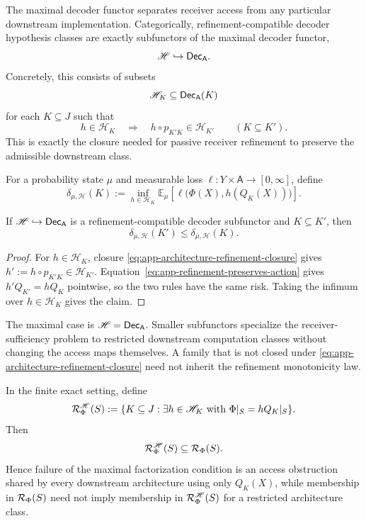 The maximal decoder functor separates receiver access from any particular downstream implementation. Categorically, refinement-compatible decoder hypothesis classes are exactly subfunctors of the maximal decoder functor,
\[
\mathscr H\hookrightarrow\mathsf{Dec}_{\mathsf A}.
\]
Concretely, this consists of subsets
\[
\mathscr H_K\subseteq\mathsf{Dec}_{\mathsf A}(K)
\]
for each $K\subseteq J$ such that
\begin{equation}
h\in\mathscr H_K
\quad\Longrightarrow\quad
h\circ p_{K'K}\in\mathscr H_{K'}
\qquad(K\subseteq K').
\label{eq:app-architecture-refinement-closure}
\end{equation}
This is exactly the closure needed for passive receiver refinement to preserve the admissible downstream class.

For a probability state $\mu$ and measurable loss $\ell:Y\times\mathsf A\to[0,\infty]$, define
\[
\delta_{\mu,\mathscr H}(K)
:=
\inf_{h\in\mathscr H_K}
\mathbb E_\mu\!\left[\ell\bigl(\Phi(X),h(Q_K(X))\bigr)\right].
\]

\begin{proposition}
\label{prop:app-architecture-refinement-monotonicity}
If $\mathscr H\hookrightarrow\mathsf{Dec}_{\mathsf A}$ is a refinement-compatible decoder subfunctor and $K\subseteq K'$, then
\[
\delta_{\mu,\mathscr H}(K')\le\delta_{\mu,\mathscr H}(K).
\]
\end{proposition}

\begin{proof}
For $h\in\mathscr H_K$, closure \eqref{eq:app-architecture-refinement-closure} gives $h':=h\circ p_{K'K}\in\mathscr H_{K'}$. Equation~\eqref{eq:app-refinement-preserves-action} gives $h'Q_{K'}=hQ_K$ pointwise, so the two rules have the same risk. Taking the infimum over $h\in\mathscr H_K$ gives the claim.
\end{proof}

The maximal case is $\mathscr H=\mathsf{Dec}_{\mathsf A}$. Smaller subfunctors specialize the receiver-sufficiency problem to restricted downstream computation classes without changing the access maps themselves. A family that is not closed under \eqref{eq:app-architecture-refinement-closure} need not inherit the refinement monotonicity law.

In the finite exact setting, define
\[
\mathcal{R}^{\mathscr H}_\Phi(S)
:=
\{K\subseteq J:\exists h\in\mathscr H_K\text{ with }\Phi|_S=hQ_K|_S\}.
\]
Then
\begin{equation}
\mathcal{R}^{\mathscr H}_\Phi(S)\subseteq\mathcal{R}_\Phi(S).
\label{eq:app-restricted-exact-subfamily}
\end{equation}
Hence failure of the maximal factorization condition is an access obstruction shared by every downstream architecture using only $Q_K(X)$, while membership in $\mathcal{R}_\Phi(S)$ need not imply membership in $\mathcal{R}^{\mathscr H}_\Phi(S)$ for a restricted architecture class.

